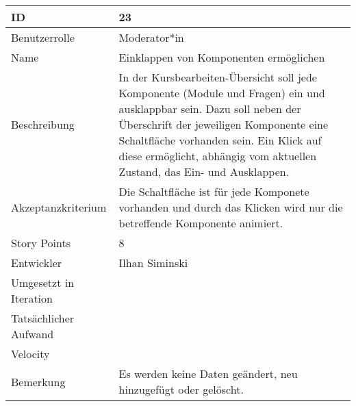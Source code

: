 \begin{tabularx}{\textwidth}{|p{}|X|}
	\hline
	ID & 23\\
	\hline
	Benutzerrolle & Moderator*in\\
	\hline
	Name & Einklappen von Komponenten ermöglichen\\
	\hline
	Beschreibung & In der Kursbearbeiten-Übersicht soll jede Komponente (Module und Fragen) ein und ausklappbar sein.
		Dazu soll neben der Überschrift der jeweiligen Komponente eine Schaltfläche vorhanden sein.
		Ein Klick auf diese ermöglicht, abhängig vom aktuellen Zustand, das Ein- und Ausklappen. \\
	\hline
	Akzeptanzkriterium & Die Schaltfläche ist für jede Komponete vorhanden und durch das Klicken wird nur die betreffende Komponente animiert.\\
	\hline
	Story Points & 8 \\
	\hline
	Entwickler & Ilhan Siminski\\
	\hline
	Umgesetzt in Iteration & \\
	\hline
	Tatsächlicher Aufwand & \\
	\hline
	Velocity & \\
	\hline
	Bemerkung & Es werden keine Daten geändert, neu hinzugefügt oder gelöscht.\\
	\hline
\end{tabularx}
\vspace{20pt}
